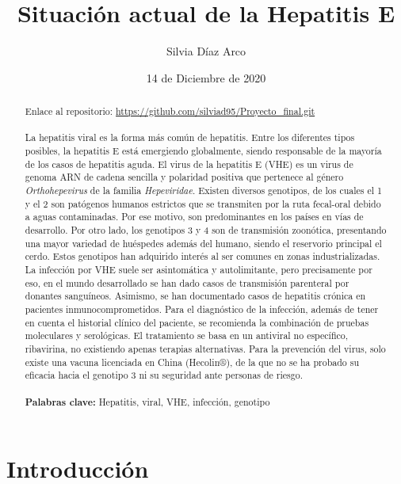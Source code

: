 \documentclass[11 pt]{article}
\title{Situación actual de la Hepatitis E}
\author{Silvia Díaz Arco}
\date{14 de Diciembre de 2020}
\begin{document}
\maketitle
	\begin{abstract}
		Enlace al repositorio: \url{https://github.com/silviad95/Proyecto_final.git}\\\\
		La hepatitis viral es la forma más común de hepatitis. Entre los diferentes tipos posibles, la hepatitis E está emergiendo globalmente, siendo responsable de la mayoría de los casos de hepatitis aguda. El virus de la hepatitis E (VHE) es un virus de genoma ARN de cadena sencilla y polaridad positiva que pertenece al género {\em Orthohepevirus} de la familia {\em Hepeviridae}. Existen diversos genotipos, de los cuales el 1 y el 2 son patógenos humanos estrictos que se transmiten por la ruta fecal-oral debido a aguas contaminadas. Por ese motivo, son predominantes en los países en vías de desarrollo. Por otro lado, los genotipos 3 y 4 son de transmisión zoonótica, presentando una mayor variedad de huéspedes además del humano, siendo el reservorio principal el cerdo. Estos genotipos han adquirido interés al ser comunes en zonas industrializadas. La infección por VHE suele ser asintomática y autolimitante, pero precisamente por eso, en el mundo desarrollado se han dado casos de transmisión parenteral por donantes sanguíneos. Asimismo, se han documentado casos de hepatitis crónica en pacientes inmunocomprometidos. Para el diagnóstico de la infección, además de tener en cuenta el historial clínico del paciente, se recomienda la combinación de pruebas moleculares y serológicas. El tratamiento se basa en un antiviral no específico, ribavirina, no existiendo apenas terapias alternativas. Para la prevención del virus, solo existe una vacuna licenciada en China (Hecolin®), de la que no se ha probado su eficacia hacia el genotipo 3 ni su seguridad ante personas de riesgo.\\\\ 
		{\bf Palabras clave:} Hepatitis, viral, VHE, infección, genotipo	
	\end{abstract}
\newpage
\tableofcontents
\newpage
\section{Introducción}
\end{document}
